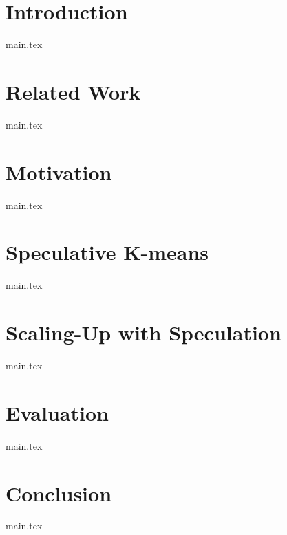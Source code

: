 \documentclass[sigplan, screen, nonacm = true]{acmart}
\begin{document}



\maketitle

\section{Introduction}
{main.tex}

\section{Related Work}
{main.tex}

\section{Motivation}
{main.tex}

\section{Speculative K-means}
{main.tex}

\section{Scaling-Up with Speculation}
{main.tex}

\section{Evaluation}
{main.tex}

\section{Conclusion}
{main.tex}


\end{document}
